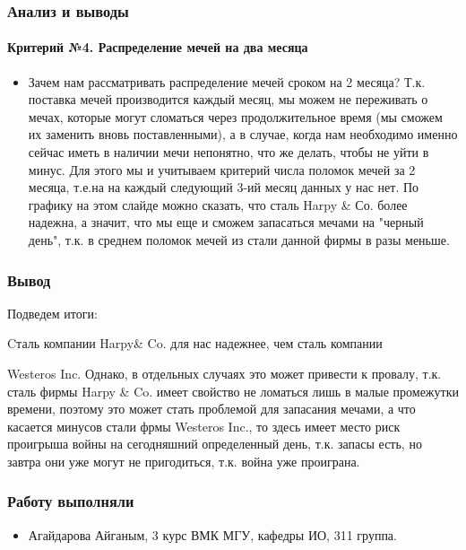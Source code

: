 \documentclass[8pt,pdf,hyperref={unicode}]{beamer}
\begin{document}
	\begin{frame}
	\frametitle{Анализ и выводы}
	\framesubtitle{Критерий №4. Распределение мечей на два месяца}
	\begin{itemize}
		\item   Зачем нам рассматривать распределение мечей сроком на 2 месяца?
		Т.к. поставка мечей производится каждый месяц, мы можем не переживать о мечах, которые могут сломаться через продолжительное время (мы сможем их заменить вновь поставленными), а в случае, когда нам необходимо именно сейчас иметь в наличии мечи непонятно, что же делать, чтобы не уйти в минус.
Для этого мы и учитываем критерий числа поломок мечей за 2 месяца, т.е.на на каждый следующий 3-ий месяц данных у нас нет.
По графику на этом слайде можно сказать, что сталь Harpy \& Со. более надежна, а значит, что мы еще и сможем запасаться мечами на "черный день", т.к. в среднем поломок мечей из стали данной фирмы в разы меньше.  				
		\end{itemize}
	\end{frame}
	\begin{frame}
	\frametitle{Вывод}
Подведем итоги:

Cталь компании Harpy\& Co. для нас надежнее, чем сталь компании

Westeros Inc. 
Однако, в отдельных случаях это может привести к провалу, т.к. сталь фирмы Harpy \& Co. имеет свойство не ломаться лишь в малые промежутки времени, поэтому это может стать проблемой для запасания мечами, а что касается минусов стали фрмы Westeros Inc., то здесь имеет место риск проигрыша войны на сегодняшний определенный день, т.к. запасы есть, но завтра они уже могут не пригодиться, т.к. война уже проиграна.
	\end{frame}
	
		\begin{frame}
		\frametitle{Работу выполняли}
		\begin{itemize}
			\item Агайдарова Айганым, 3 курс ВМК МГУ, кафедры ИО, 311 группа.\\
		\end{itemize}	
	\end{frame}
	
	
\end{document}
